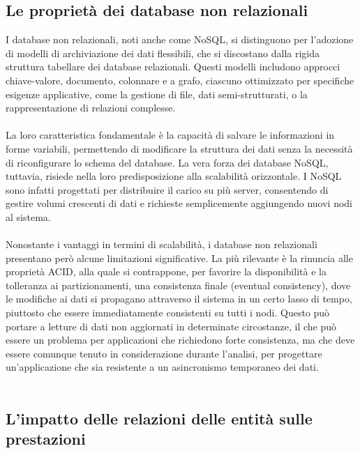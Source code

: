 \subsection {Le proprietà dei database non relazionali}

I database non relazionali, noti anche come NoSQL,
si distinguono per l'adozione di modelli di archiviazione dei dati flessibili,
che si discostano dalla rigida struttura tabellare dei database relazionali.
Questi modelli includono approcci chiave-valore, documento, colonnare e a grafo,
ciascuno ottimizzato per specifiche esigenze applicative,
come la gestione di file, dati semi-strutturati, o la rappresentazione di relazioni complesse.\\
\\
La loro caratteristica fondamentale è la capacità di salvare le informazioni in forme variabili,
permettendo di modificare la struttura dei dati senza la necessità di riconfigurare lo schema del database.
La vera forza dei database NoSQL, tuttavia, risiede nella loro predisposizione alla scalabilità orizzontale.
I NoSQL sono infatti progettati per distribuire il carico su più server,
consentendo di gestire volumi crescenti di dati e richieste semplicemente aggiungendo nuovi nodi al sistema.\\
\\
Nonostante i vantaggi in termini di scalabilità,
i database non relazionali presentano però alcune limitazioni significative.
La più rilevante è la rinuncia alle proprietà ACID, alla quale si contrappone,
per favorire la disponibilità e la tolleranza ai partizionamenti,
una consistenza finale (eventual consistency),
dove le modifiche ai dati si propagano attraverso il sistema in un certo lasso di tempo,
piuttosto che essere immediatamente consistenti su tutti i nodi.
Questo può portare a letture di dati non aggiornati in determinate circostanze,
il che può essere un problema per applicazioni che richiedono forte consistenza,
ma che deve essere comunque tenuto in considerazione durante l'analisi,
per progettare un'applicazione che sia resistente a un asincronismo temporaneo dei dati.\\
\\



\subsection{L'impatto delle relazioni delle entità sulle prestazioni}

